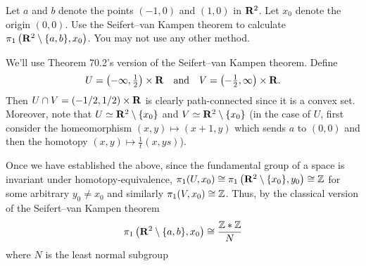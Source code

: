 \begin{problem}
  Let $a$ and $b$ denote the points $(-1,0)$ and $(1,0)$ in $\mathbf{R}^2$. Let
  $x_0$ denote the origin $(0,0)$. Use the Seifert--van Kampen theorem to
  calculate $\pi_1\left(\mathbf{R}^2\setminus\{a,b\},x_0\right)$. You may
  not use any other method.
\end{problem}
\begin{solution}
  We'll use Theorem 70.2's version of the Seifert--van Kampen
  theorem. Define
  \[
    U=\left(-\infty,\tfrac{1}{2}\right)\times\mathbf{R} \quad\text{and}\quad
    V=\left(-\tfrac{1}{2},\infty\right)\times\mathbf{R}.
  \]
  Then $U\cap V=(-1/2,1/2)\times\mathbf{R}$ is clearly path-connected since it is
  a convex set. Moreover, note that $U\simeq\mathbf{R}^2\setminus\{x_0\}$
  and $V\simeq\mathbf{R}^2\setminus\{x_0\}$ (in the case of $U$, first
  consider the homeomorphism $(x,y)\mapsto(x+1,y)$ which sends $a$ to
  $(0,0)$ and then the homotopy $(x,y)\mapsto\tfrac{1}{t}(x,ys)$).

  Once we have established the above, since the fundamental group of a
  space is invariant under homotopy-equivalence,
  $\pi_1(U,x_0)\cong\pi_1\left(\mathbf{R}^2\setminus\{x_0\},y_0\right)\cong\mathbb{Z}$
  for some arbitrary $y_0\neq x_0$ and similarly
  $\pi_1(V,x_0)\cong\mathbb{Z}$. Thus, by the classical version of the
  Seifert--van Kampen theorem
  \[
    \pi_1\left(\mathbf{R}^2\setminus\{a,b\},x_0\right)\cong
    \frac{\mathbb{Z}*\mathbb{Z}}{N}
  \]
  where $N$ is the least normal subgroup
\end{solution}

